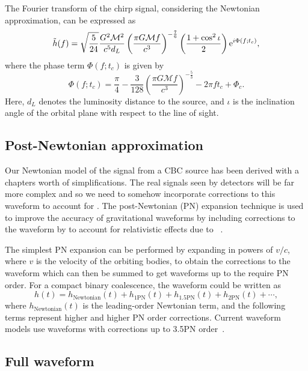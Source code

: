 The Fourier transform of the chirp signal, considering the Newtonian approximation, can be expressed as
%
\begin{equation}
    \Tilde{h}(f) = \sqrt{\frac{5}{24}} \frac{G^2 \mathcal{M}^2}{c^5 d_L} \left(\frac{\pi G \mathcal{M} f}{c^3}\right)^{-\frac{7}{6}} \left(\frac{1 + \cos^2 \iota}{2}\right) {\rm e}^{i \Phi(f; t_c)},
\end{equation}
%
where the phase term \( \Phi(f; t_c) \) is given by
%
\begin{equation}
    \Phi(f; t_c) = \frac{\pi}{4} - \frac{3}{128} \left(\frac{\pi G \mathcal{M} f}{c^3}\right)^{-\frac{5}{3}} - 2\pi f t_c + \Phi_c.
\end{equation}
%
Here, \( d_L \) denotes the luminosity distance to the source, and \( \iota \) is the inclination angle of the orbital plane with respect to the line of sight.

\subsection{\label{1:sec:post_newtonian_treatment}Post-Newtonian approximation}

Our Newtonian model of the \gwadj signal from a CBC source has been derived with a chapters worth of simplifications. The real signals seen by \gwadj detectors will be far more complex and so we need to somehow incorporate corrections to this waveform to account for \GR. The post-Newtonian (PN) expansion technique is used to improve the accuracy of gravitational waveforms by including corrections to the waveform by to account for relativistic effects due to \GR~\cite{2PN_1:1996, 2PN_2:1996, 2PN_3:1995}.

The simplest PN expansion can be performed by expanding in powers of \( v/c \), where \( v \) is the velocity of the orbiting bodies, to obtain the corrections to the waveform which can then be summed to get waveforms up to the require PN order. For a compact binary coalescence, the waveform could be written as
%
\begin{equation}
    h(t) = h_{\text{Newtonian}}(t) + h_{\text{1PN}}(t) + h_{\text{1.5PN}}(t) + h_{\text{2PN}}(t) + \cdots,
\end{equation}
%
where \( h_{\text{Newtonian}}(t) \) is the leading-order Newtonian term, and the following terms represent higher and higher PN order corrections. Current waveform models use waveforms with corrections up to 3.5PN order~\cite{PN_models:2009}.

\subsection{\label{1:sec:full_waveform}Full waveform}

